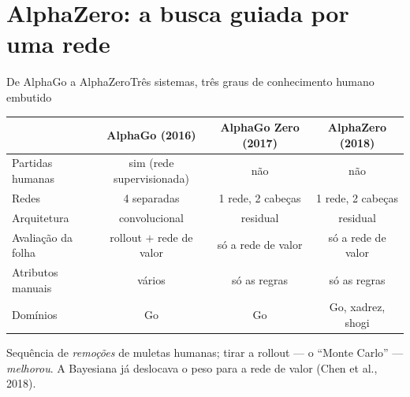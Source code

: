 \documentclass[aspectratio=169, 10pt]{beamer}
\begin{document}
\section{AlphaZero: a busca guiada por uma rede}

\begin{frame}{De AlphaGo a AlphaZero}{Três sistemas, três graus de conhecimento humano embutido}
  \small
  \begin{center}
  \begin{tabular}{lccc}
    \toprule
     & \textbf{AlphaGo} (2016) & \textbf{AlphaGo Zero} (2017) & \textbf{AlphaZero} (2018) \\
    \midrule
    Partidas humanas       & sim (rede supervisionada) & \alert{não} & \alert{não} \\
    Redes                  & 4 separadas & 1 rede, 2 cabeças & 1 rede, 2 cabeças \\
    Arquitetura            & convolucional & residual & residual \\
    Avaliação da folha     & rollout $+$ rede de valor & \alert{só a rede de valor} & só a rede de valor \\
    Atributos manuais      & vários & só as regras & só as regras \\
    Domínios               & Go & Go & Go, xadrez, shogi \\
    \bottomrule
  \end{tabular}
  \end{center}

  \medskip
  \begin{ideiabox}
    Sequência de \emph{remoções} de muletas humanas; tirar a rollout — o ``Monte Carlo'' — \emph{melhorou}. A Bayesiana já deslocava o peso para a rede de valor (Chen et al., 2018).
  \end{ideiabox}
\end{frame}
\end{document}
